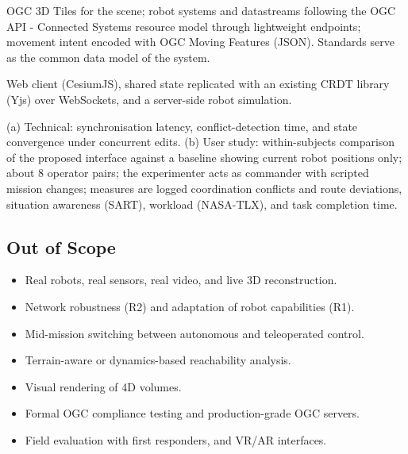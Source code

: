 \documentclass{article}
\begin{document}
\begin{description}[style=nextline]
  \item[Standards] OGC 3D Tiles for the scene; robot systems and datastreams following the OGC API - Connected Systems resource model through lightweight endpoints; movement intent encoded with OGC Moving Features (JSON). Standards serve as the common data model of the system.
  \item[Architecture] Web client (CesiumJS), shared state replicated with an existing CRDT library (Yjs) over WebSockets, and a server-side robot simulation.
  \item[Evaluation] (a) Technical: synchronisation latency, conflict-detection time, and state convergence under concurrent edits. (b) User study: within-subjects comparison of the proposed interface against a baseline showing current robot positions only; about 8 operator pairs; the experimenter acts as commander with scripted mission changes; measures are logged coordination conflicts and route deviations, situation awareness (SART), workload (NASA-TLX), and task completion time.
\end{description}

\subsection{Out of Scope}
\begin{itemize}
  \item Real robots, real sensors, real video, and live 3D reconstruction.
  \item Network robustness (R2) and adaptation of robot capabilities (R1).
  \item Mid-mission switching between autonomous and teleoperated control.
  \item Terrain-aware or dynamics-based reachability analysis.
  \item Visual rendering of 4D volumes.
  \item Formal OGC compliance testing and production-grade OGC servers.
  \item Field evaluation with first responders, and VR/AR interfaces.
\end{itemize}

\newpage


\end{document}
